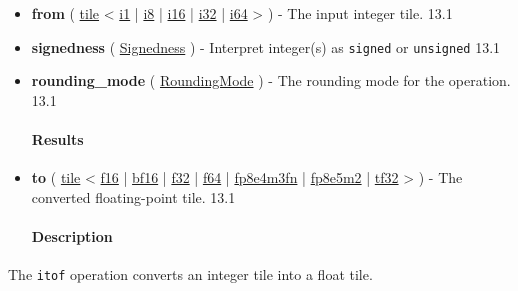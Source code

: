 \documentclass{article}
\begin{document}
\begin{itemize}
\item \textbf{from} ( \href{https://docs.nvidia.com/cuda/tile-ir/latest/sections/types.html#type-tile}{tile} < \href{https://docs.nvidia.com/cuda/tile-ir/latest/sections/types.html#subsection-element-types}{i1} | \href{https://docs.nvidia.com/cuda/tile-ir/latest/sections/types.html#subsection-element-types}{i8} | \href{https://docs.nvidia.com/cuda/tile-ir/latest/sections/types.html#subsection-element-types}{i16} | \href{https://docs.nvidia.com/cuda/tile-ir/latest/sections/types.html#subsection-element-types}{i32} | \href{https://docs.nvidia.com/cuda/tile-ir/latest/sections/types.html#subsection-element-types}{i64} > ) - The input integer tile. 13.1
\item \textbf{signedness} ( \href{https://docs.nvidia.com/cuda/tile-ir/latest/sections/operations.html#op-attribute-cuda-tile-itof-signedness-attr}{Signedness} ) - Interpret integer(s) as \texttt{signed} or \texttt{unsigned} 13.1
\item \textbf{rounding\_mode} ( \href{https://docs.nvidia.com/cuda/tile-ir/latest/sections/operations.html#op-attribute-cuda-tile-itof-roundingmode-attr}{RoundingMode} ) - The rounding mode for the operation. 13.1


\paragraph{Results}

\item \textbf{to} ( \href{https://docs.nvidia.com/cuda/tile-ir/latest/sections/types.html#type-tile}{tile} < \href{https://docs.nvidia.com/cuda/tile-ir/latest/sections/types.html#subsection-element-types}{f16} | \href{https://docs.nvidia.com/cuda/tile-ir/latest/sections/types.html#subsection-element-types}{bf16} | \href{https://docs.nvidia.com/cuda/tile-ir/latest/sections/types.html#subsection-element-types}{f32} | \href{https://docs.nvidia.com/cuda/tile-ir/latest/sections/types.html#subsection-element-types}{f64} | \href{https://docs.nvidia.com/cuda/tile-ir/latest/sections/types.html#subsection-element-types}{fp8e4m3fn} | \href{https://docs.nvidia.com/cuda/tile-ir/latest/sections/types.html#subsection-element-types}{fp8e5m2} | \href{https://docs.nvidia.com/cuda/tile-ir/latest/sections/types.html#subsection-element-types}{tf32} > ) - The converted floating-point tile. 13.1


\paragraph{Description}

\end{itemize}
The \texttt{itof} operation converts an integer tile into a float tile.
\end{document}
